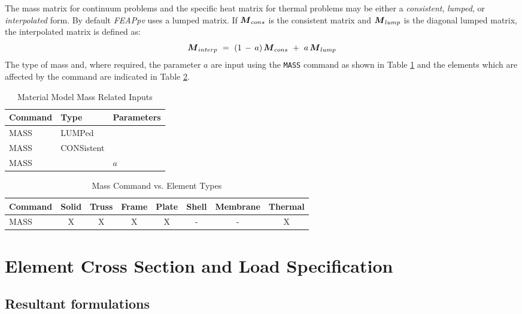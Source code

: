 The mass matrix for continuum problems and the specific heat matrix
for thermal problems may be either a {\it consistent}, {\it lumped},
or {\it interpolated} form.  By default {\it FEAPpv} uses a lumped matrix.
If $\boldsymbol{M}_{cons}$ is the consistent matrix and $\boldsymbol{M}_{lump}$ is the diagonal
lumped matrix, the interpolated matrix is defined as:
\begin{equation}
\boldsymbol{M}_{interp} ~=~ (1 \,-\, a) \, \boldsymbol{M}_{cons} ~+~ a \, \boldsymbol{M}_{lump}
\end{equation}
The type of mass and, where required,
the parameter $a$ are input using the {\tt MASS} command as shown in
Table \ref{tab132a} and the elements which are affected by the command
are indicated in Table \ref{tab132b}.

\begin{table}[ht!]
\begin{center}
\begin{tabular}{| l | l | l |} \hline
Command & Type & Parameters \\ \hline
MASS & LUMPed       & {}  \\
MASS & CONSistent   & {}  \\
MASS & {}           & $a$ \\ \hline
\end{tabular}
\end{center}
\caption{Material Model Mass Related Inputs}
\label{tab132a}
\end{table}

\begin{table}[ht!]
\begin{center}
\begin{tabular}{| l | c | c | c | c | c | c | c |} \hline
Command & Solid & Truss & Frame & Plate & Shell & Membrane & Thermal \\ \hline
MASS          & X & X & X & X & - & - & X \\ \hline
\end{tabular}
\end{center}
\caption{Mass Command vs. Element Types}
\label{tab132b}
\end{table}

\section{Element Cross Section and Load Specification}
\label{xsect}

\subsection{Resultant formulations}

